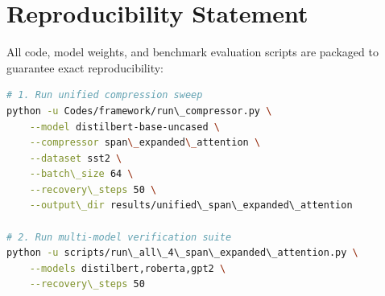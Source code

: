 \section{Reproducibility Statement}
All code, model weights, and benchmark evaluation scripts are packaged to guarantee exact reproducibility:
\begin{lstlisting}[language=bash]
# 1. Run unified compression sweep
python -u Codes/framework/run\_compressor.py \
    --model distilbert-base-uncased \
    --compressor span\_expanded\_attention \
    --dataset sst2 \
    --batch\_size 64 \
    --recovery\_steps 50 \
    --output\_dir results/unified\_span\_expanded\_attention

# 2. Run multi-model verification suite
python -u scripts/run\_all\_4\_span\_expanded\_attention.py \
    --models distilbert,roberta,gpt2 \
    --recovery\_steps 50
\end{lstlisting}
